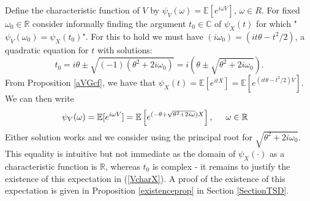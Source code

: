 \documentclass{article}
\begin{document}
Define the characteristic function of $V$ by $\psi_V(\omega) = \mathbb{E}[e^{i \omega V}]$, $\omega \in  R.$  For fixed $\omega_0\in\mathbb{R}$ consider informally finding the argument $t_0\in\mathbb{C}$ of $\psi_X(t)$ for which
"$\psi_V(\omega_0) = \psi_X(t_0)$".  For this to hold we must have
$(i\omega_0) = (i t \theta - t^2/2)$, a quadratic equation for $t$ with solutions:
$$t_0 = i \theta  \pm \sqrt{ (-1) ( \theta^2 + 2 i\omega_0) } = i\left( \theta \pm \sqrt{ \theta^2 + 2 i \omega_0}\right).$$
From Proposition \ref{aVGcf}, we have that $\psi_X(t) = \mathbb{E}[e^{itX}] = \mathbb{E}[e^{(it \theta - t^2 /2) V} ]$. We can then write
\begin{align}
    \psi_V(\omega) &= \mathbb{E}[e^{i\omega V}] = \mathbb{E}\left[e^{(-\theta+\sqrt{\theta^2+2i\omega})X}\right], \hspace{0.5cm}\omega\in\mathbb{R} \label{VcharX}
\end{align}
Either solution works and we consider using the principal root for $\sqrt{\theta^2 + 2 i \omega_0}$.  This equality is intuitive but not immediate as the domain of $\psi_X(\cdot)$ as a characteristic function is $\mathbb{R}$, whereas $t_0$ is complex - it remains to justify the existence of this expectation in (\ref{VcharX}). A proof of the existence of this expectation is given in Proposition \ref{existenceprop} in Section \ref{SectionTSD}. 
\end{document}
